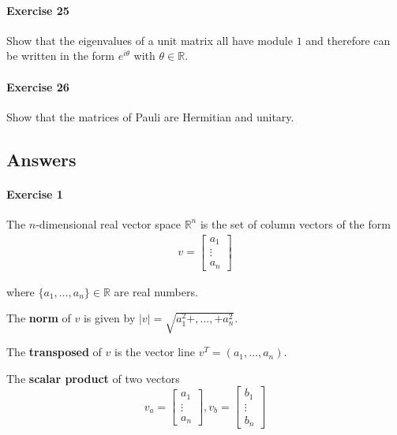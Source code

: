 \documentclass[a4paper,10pt]{article}
\begin{document}
\paragraph{Exercise 25}
\label{ex25q}
Show that the eigenvalues of a unit matrix all have module $1$ and therefore can be written in the form $e^{i\theta}$ with $\theta \in \mathbb{R}$.
\paragraph{Exercise 26}
\label{ex26q}
Show that the matrices of Pauli are Hermitian and unitary.
















\newpage

\subsection{Answers}
\paragraph{Exercise 1} 
\label{ex01a}
The $n$-dimensional real vector space ${\mathbb{R}}^n$ is the set of column vectors of the form
\begin{equation*}
\begin{aligned}
v = {\begin{bmatrix}
a_1 \\
\vdots \\
a_n
\end{bmatrix}}
\end{aligned}
\end{equation*}

where $\{a_1, \ldots, a_n\} \in \mathbb{R}$ are real numbers. 

The \textbf{norm} of $v$ is given by $|v| = \sqrt{a_1^2 +, \ldots, + a_n^2}$. 

The \textbf{transposed} of $v$ is the vector line $v^T = (a_1, \ldots, a_n)$. 

The \textbf{scalar product} of two vectors
$$v_a = {\begin{bmatrix}
a_1 \\
\vdots \\
a_n
\end{bmatrix}}, v_b = {\begin{bmatrix}
b_1 \\
\vdots \\
b_n
\end{bmatrix}}$$
\end{document}
